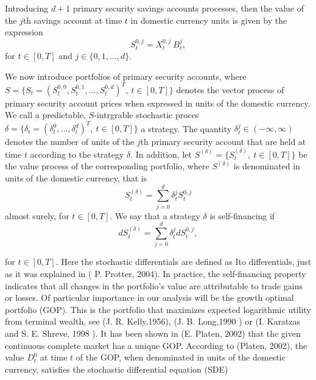 \documentclass[a4 paper, 12pt]{report}
\theoremstyle{plain}
\begin{document}
Introducing $d+1$ primary security savings accounts processes, then the value of the $j$th savings account at time $t$ in domestic currency units is given by the expression
\begin{equation}\label{3.2} 
S_t^{0,j} = X_t^{0,j}~B_t^j,
\end{equation}
for $t\in[0,T]$ and $j\in\{0,1,\ldots,d\}$.\\
\par We now introduce portfolios of primary security accounts, where $S= \{S_t = (S_t^{0,0},S_t^{0,1},\ldots,S_t^{0,d})^T,~t\in[0,T]\}$ denotes the vector process of primary security account prices when expressed in units of the domestic currency. We call a predictable, $S$-intrgrable stochastic proces $\delta = \{\delta_t = (\delta_t^0,\ldots,\delta_t^d)^T,~t\in[0,T]\}$ a strategy. The quantity $\delta_t^j\in (-\infty,\infty)$ denotes the number of units of the $j$th primary security account that are held at time $t$ according to the strategy $\delta$. In addition, let $S^{(\delta)} = \{S_t^{(\delta)},~t\in[0,T]\}$ be the value process of the corresponding portfolio, where $S^{(\delta)}$ is denominated in units of the domestic currency, that is
\begin{equation}\label{3.3}
S_t^{(\delta)} = \sum_{j = 0}^d \delta_t^jS_t^{0,j}
\end{equation}
almost surely, for $t\in[0,T]$. We say that a strategy $\delta$ is self-financing if
\begin{equation}\label{3.4}
dS_t^{(\delta)} = \sum_{j = 0}^d\delta_t^jdS_t^{0,j},
\end{equation}

for $t \in [0,T]$. Here the stochastic differentials are defined as Ito differentials,
just as it was explained in ( P. Protter, 2004). In practice, the self-financing property indicates that all changes in the portfolio's value are attributable to trade gains or losses. %
Of particular importance in our analysis will be the growth
optimal portfolio (GOP). This is the portfolio that maximizes expected
logarithmic utility from terminal wealth, see (J. R. Kelly,1956), (J. B. Long,1990 )
or (I. Karatzas and S. E. Shreve, 1998 ). It has been shown in (E. Platen, 2002)
that the given continuous complete market has a unique GOP. According to
(Platen, 2002), the value $D^0_t$ at time $t$ of the GOP, when denominated in units of the domestic currency, satisfies the stochastic differential equation (SDE)
\end{document}

